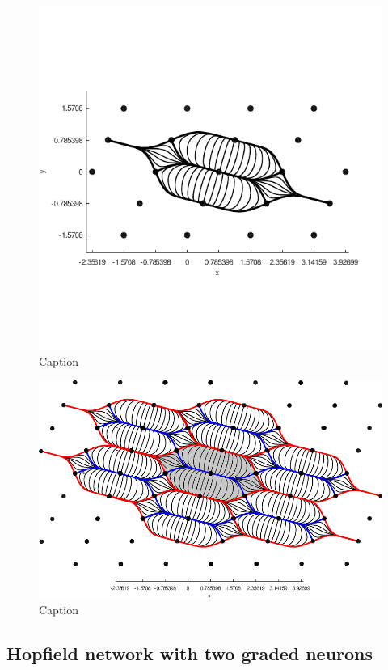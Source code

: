 \begin{figure}[ht]
\centering
\includegraphics[scale=1.50]{./images/Gradient6.pdf}
\caption{Caption}
\end{figure}

\begin{figure}[ht]
\centering
\includegraphics[scale=1.00]{./images/Gradient7.pdf}
\caption{Caption}
\end{figure}

\subsection{Hopfield network with two graded neurons}

